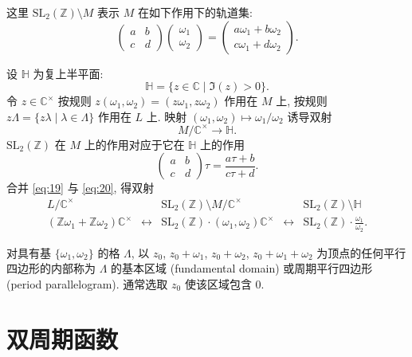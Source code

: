 这里 $\mathrm{SL}_2(\mathbb{Z})\setminus M$ 表示 $M$ 在如下作用下的轨道集:
\[
\begin{pmatrix}a & b\\ c & d\end{pmatrix}\begin{pmatrix}\omega_1\\ \omega_2\end{pmatrix} = \begin{pmatrix}a\omega_1 + b\omega_2\\ c\omega_1 + d\omega_2\end{pmatrix}.
\]

设 $\mathbb{H}$ 为复上半平面:
\[
\mathbb{H} = \{z\in\mathbb{C} \mid \Im(z) > 0\}.
\]
令 $z\in\mathbb{C}^{\times}$ 按规则 $z(\omega_1, \omega_2) = (z\omega_1, z\omega_2)$ 作用在 $M$ 上, 按规则 $z\Lambda = \{z\lambda \mid \lambda\in\Lambda\}$ 作用在 $L$ 上. 映射 $(\omega_1, \omega_2)\mapsto\omega_1/\omega_2$ 诱导双射
\begin{equation} \label{eq:20}
M/\mathbb{C}^{\times}\to\mathbb{H}.
\tag{20}
\end{equation}
$\mathrm{SL}_2(\mathbb{Z})$ 在 $M$ 上的作用对应于它在 $\mathbb{H}$ 上的作用
\[
\begin{pmatrix}a & b\\ c & d\end{pmatrix}\tau = \frac{a\tau + b}{c\tau + d}.
\]
合并 \eqref{eq:19} 与 \eqref{eq:20}, 得双射
\[
\begin{array}{ccccc}
L/\mathbb{C}^{\times} & & \mathrm{SL}_2(\mathbb{Z})\setminus M/\mathbb{C}^{\times} & & \mathrm{SL}_2(\mathbb{Z})\setminus\mathbb{H}\\
(\mathbb{Z}\omega_1 + \mathbb{Z}\omega_2)\mathbb{C}^{\times} & \longleftrightarrow & \mathrm{SL}_2(\mathbb{Z})\cdot(\omega_1, \omega_2)\mathbb{C}^{\times} & \longleftrightarrow & \mathrm{SL}_2(\mathbb{Z})\cdot\frac{\omega_1}{\omega_2}.
\end{array}
\]

对具有基 $\{\omega_1, \omega_2\}$ 的格 $\Lambda$, 以 $z_0$, $z_0+\omega_1$, $z_0+\omega_2$, $z_0+\omega_1+\omega_2$ 为顶点的任何平行四边形的内部称为 $\Lambda$ 的基本区域 (fundamental domain) 或周期平行四边形 (period parallelogram). 通常选取 $z_0$ 使该区域包含 $0$.

\section{双周期函数}\label{sec:3.2}

